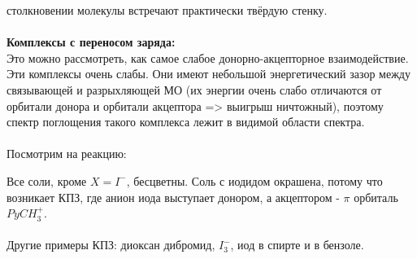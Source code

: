 столкновении молекулы встречают практически твёрдую стенку. \\ \\
\textbf{Комплексы с переносом заряда:} \\
Это можно рассмотреть, как самое слабое донорно-акцепторное
взаимодействие. Эти комплексы очень слабы. Они имеют
небольшой энергетический зазор между связывающей и
разрыхляющей МО (их энергии очень слабо отличаются от
орбитали донора и орбитали акцептора => выигрыш ничтожный),
поэтому спектр поглощения такого комплекса лежит в видимой
области спектра. \\ \\
Посмотрим на реакцию:
\begin{figure} [H]
	\centering {\texttt{[image: rr8]}}
\end{figure}
Все соли, кроме $X=I^-$, бесцветны. Соль с иодидом окрашена, потому
что возникает КПЗ, где анион иода выступает донором, а
акцептором - $\pi$ орбиталь $PyCH_3^+$. \\ \\
Другие примеры КПЗ: диоксан дибромид, $I_3^-$, иод в спирте и в
бензоле.


